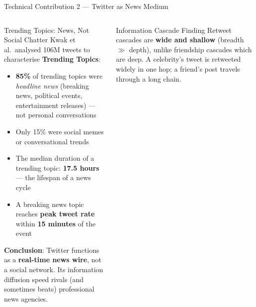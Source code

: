 \documentclass[aspectratio=169,10pt]{beamer}
\begin{document}
\begin{frame}{Technical Contribution 2 — Twitter as News Medium}
  \begin{columns}[T]
      \begin{block}{Trending Topics: News, Not Social Chatter}
        Kwak et al.\ analysed 106M tweets to characterise
        \textbf{Trending Topics}:
        \begin{itemize}
          \item \textbf{85\%} of trending topics were \emph{headline
                news} (breaking news, political events, entertainment
                releases) — not personal conversations
          \item Only 15\% were social memes or conversational trends
          \item The median duration of a trending topic:
                \textbf{17.5 hours} — the lifespan of a news cycle
          \item A breaking news topic reaches \textbf{peak tweet rate}
                within \textbf{15 minutes} of the event
        \end{itemize}
        \textbf{Conclusion}: Twitter functions as a
        \textbf{real-time news wire}, not a social network.
        Its information diffusion speed rivals (and sometimes beats)
        professional news agencies.
      \end{block}
      \vspace{4pt}
      \begin{alertblock}{Information Cascade Finding}
        Retweet cascades are \textbf{wide and shallow} (breadth $\gg$
        depth), unlike friendship cascades which are deep.
        A celebrity's tweet is retweeted widely in one hop;
        a friend's post travels through a long chain.
      \end{alertblock}


\end{columns}
\end{frame}
\end{document}
